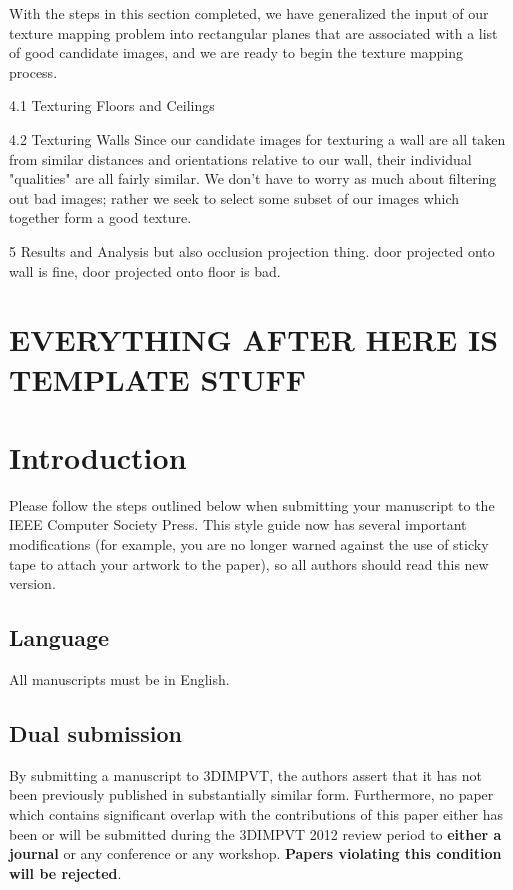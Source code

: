 \documentclass[10pt,twocolumn,letterpaper]{article}
\begin{document}
With the steps in this section completed, we have generalized the
input of our texture mapping problem into rectangular planes that are
associated with a list of good candidate images, and we are ready to
begin the texture mapping process.






4.1 Texturing Floors and Ceilings




4.2 Texturing Walls Since our candidate images for texturing a wall
are all taken from similar distances and orientations relative to our
wall, their individual "qualities" are all fairly similar. We don't
have to worry as much about filtering out bad images; rather we seek
to select some subset of our images which together form a good
texture.

5 Results and Analysis but also occlusion projection thing. door
projected onto wall is fine, door projected onto floor is bad.

\section{EVERYTHING AFTER HERE IS TEMPLATE STUFF}






\section{Introduction}

Please follow the steps outlined below when submitting your manuscript
to the IEEE Computer Society Press.  This style guide now has several
important modifications (for example, you are no longer warned against
the use of sticky tape to attach your artwork to the paper), so all
authors should read this new version.

\subsection{Language}

All manuscripts must be in English.

\subsection{Dual submission}

By submitting a manuscript to 3DIMPVT, the authors assert that it has
not been previously published in substantially similar
form. Furthermore, no paper which contains significant overlap with
the contributions of this paper either has been or will be submitted
during the 3DIMPVT 2012 review period to {\bf either a journal} or any
conference or any workshop.  {\bf Papers violating this condition will
  be rejected}.
\end{document}
